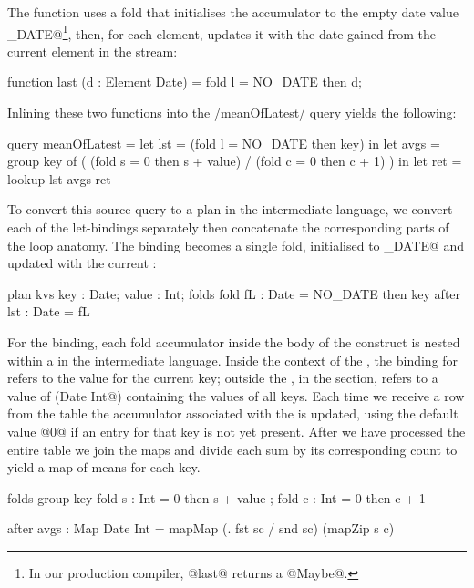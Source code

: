 The \IcC@last@ function uses a fold that initialises the accumulator to the empty date value \IcC@NO_DATE@\footnote{In our production compiler, @last@ returns a @Maybe@.}, then, for each element, updates it with the date gained from the current element in the stream:
\begin{icicle}
function last (d : Element Date)
 = fold l = NO_DATE then d;
\end{icicle}



\pagebreak
Inlining these two functions into the \Hs/meanOfLatest/ query yields the following:
\begin{icicle}
query meanOfLatest
 = let lst  = (fold l = NO_DATE then key) in
   let avgs = group key of
              ( (fold s = 0 then s + value)
              / (fold c = 0 then c + 1) ) in
   let ret  = lookup lst avgs
   ret
\end{icicle}

To convert this source query to a plan in the intermediate language, we convert each of the let-bindings separately then concatenate the corresponding parts of the loop anatomy.
The \IcC@lst@ binding becomes a single fold, initialised to \IcC@NO_DATE@ and updated with the current \IcC@key@:
\begin{icicle-core}
plan kvs {      key : Date; value : Int;       }
folds    { fold fL  : Date = NO_DATE then key  }
after    {      lst : Date = fL                }
\end{icicle-core}

For the \IcC@avgs@ binding, each fold accumulator inside the body of the \IcC@group@ construct is nested within a \IcC@group@ in the intermediate language.
Inside the context of the \IcC@group@, the binding for \IcC@s@ refers to the \IcC@Int@ value for the current key; outside the \IcC@group@, in the \IcC@after@ section, \IcC@s@ refers to a value of (\IcC@Map Date Int@) containing the values of all keys.
Each time we receive a row from the table the accumulator associated with the \IcC@key@ is updated, using the default value @0@ if an entry for that key is not yet present.
After we have processed the entire table we join the maps and divide each sum by its corresponding count to yield a map of means for each key.
\begin{icicle-core}
folds  { group key
          { fold s : Int = 0 then s + value
          ; fold c : Int = 0 then c + 1 } }

after  { avgs : Map Date Int
          = mapMap (\sc. fst sc / snd sc) (mapZip s c) }
\end{icicle-core}

